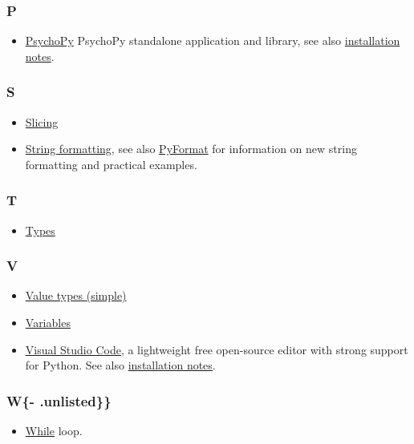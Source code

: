 \documentclass[
]{book}
\providecommand{\tightlist}{%
  \setlength{\itemsep}{0pt}\setlength{\parskip}{0pt}}
\begin{document}
\hypertarget{p}{%
\subsubsection*{P}\label{p}}

\begin{itemize}
\tightlist
\item
  \href{https://www.psychopy.org/}{PsychoPy} PsychoPy standalone application and library, see also \protect\hyperlink{install-psychopy}{installation notes}.
\end{itemize}

\hypertarget{s}{%
\subsubsection*{S}\label{s}}

\begin{itemize}
\tightlist
\item
  \protect\hyperlink{lists}{Slicing}
\item
  \protect\hyperlink{string-formatting}{String formatting}, see also \href{https://pyformat.info/}{PyFormat} for information on new string formatting and practical examples.
\end{itemize}

\hypertarget{t}{%
\subsubsection*{T}\label{t}}

\begin{itemize}
\tightlist
\item
  \protect\hyperlink{value-types}{Types}
\end{itemize}

\hypertarget{v}{%
\subsubsection*{V}\label{v}}

\begin{itemize}
\item
  \protect\hyperlink{value-types}{Value types (simple)}
\item
  \protect\hyperlink{variables}{Variables}
\item
  \href{https://code.visualstudio.com/}{Visual Studio Code}, a lightweight free open-source editor with strong support for Python. See also \protect\hyperlink{install-vs-code}{installation notes}.
\end{itemize}

\hypertarget{w--.unlisted}{%
\subsubsection{W\{- .unlisted\}\}}\label{w--.unlisted}}

\begin{itemize}
\tightlist
\item
  \protect\hyperlink{while-loop}{While} loop.
\end{itemize}
\end{document}
